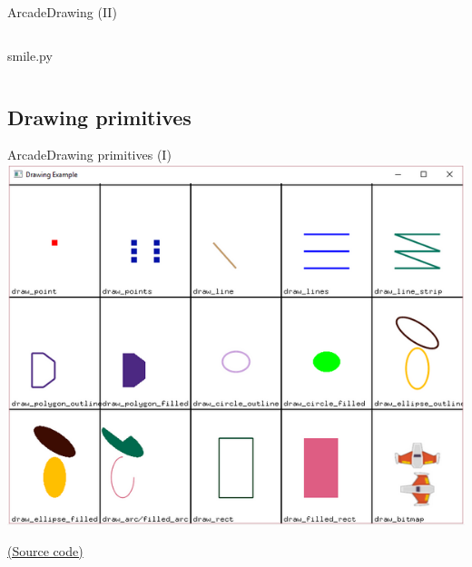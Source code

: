 \documentclass[10pt,compress]{beamer} %
\begin{document}
\begin{frame}{Arcade}{Drawing (II)}
	\begin{columns}
 	   \column{\textwidth}
		\vspace{-0.2cm}
		\begin{exampleblock}{smile.py}
		\vspace{-0.2cm}
		
		\vspace{-0.2cm}
		\end{exampleblock}
	\end{columns}
\end{frame}

\subsection{Drawing primitives}

\begin{frame}{Arcade}{Drawing primitives (I)}
	\centering \includegraphics[width=0.7\linewidth]{figs/primitives.png} \\
    \bigskip

    \href{https://api.arcade.academy/en/latest/examples/drawing_primitives.html}{(Source code)}
\end{frame}
\end{document}
